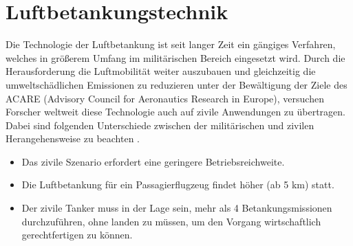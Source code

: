 \chapter{Luftbetankungstechnik}\label{cha:SdT}
Die Technologie der Luftbetankung ist seit langer Zeit ein gängiges Verfahren, welches in größerem Umfang im militärischen Bereich eingesetzt wird. Durch die Herausforderung die Luftmobilität weiter auszubauen und gleichzeitig die umweltschädlichen Emissionen zu reduzieren unter der Bewältigung der Ziele des ACARE (Advisory Council for Aeronautics Research in Europe), versuchen Forscher weltweit diese Technologie auch auf zivile Anwendungen zu übertragen. Dabei sind folgenden Unterschiede zwischen der militärischen und zivilen Herangehensweise zu beachten \cite{CEAS2015}.
\begin{itemize}
    \item Das zivile Szenario erfordert eine geringere Betriebsreichweite.
    \item Die Luftbetankung für ein Passagierflugzeug findet höher (ab 5 km) statt.
    \item Der zivile Tanker muss in der Lage sein, mehr als 4 Betankungsmissionen durchzuführen, ohne landen zu müssen, um den Vorgang wirtschaftlich gerechtfertigen zu können.
\end{itemize}

